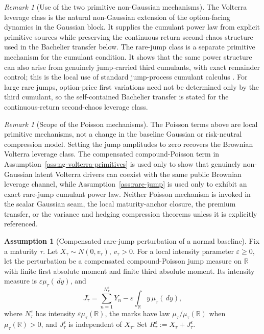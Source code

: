 \documentclass[11pt,a4paper]{amsart}
\theoremstyle{plain}
\theoremstyle{definition}
\newtheorem{assumption}[theorem]{Assumption}
\theoremstyle{remark}
\newtheorem{remark}[theorem]{Remark}
\newcommand{\R}{\mathbb{R}}
\newcommand{\dd}{\,d}
\begin{document}
\begin{remark}[Use of the two primitive non-Gaussian mechanisms]\label{rem:primitive-ng-lowerers}
The Volterra leverage class is the natural non-Gaussian extension of the option-facing dynamics in
the Gaussian block.  It supplies the cumulant power law from explicit primitive sources while
preserving the continuous-return second-chaos structure used in the Bachelier transfer below.  The
rare-jump class is a separate primitive mechanism for the cumulant condition.  It shows that the same
power structure can also arise from genuinely jump-carried third cumulants, with exact remainder
control; this is the local use of standard jump-process cumulant calculus
\cite{sato1999levy,contTankov2004jumps}.  For large rare jumps, option-price first variations need not be determined only by the
third cumulant, so the self-contained Bachelier transfer is stated for the continuous-return
second-chaos leverage class.
\end{remark}

\begin{remark}[Scope of the Poisson mechanisms]\label{rem:poisson-lowerer-scope}
The Poisson terms above are local primitive mechanisms, not a change in the baseline Gaussian or
risk-neutral compression model.  Setting the jump amplitudes to zero recovers the Brownian
Volterra leverage class.  The compensated compound-Poisson term in
Assumption~\ref{ass:ng-volterra-primitives} is used only to show that genuinely non-Gaussian
latent Volterra drivers can coexist with the same public Brownian leverage channel, while
Assumption~\ref{ass:rare-jump} is used only to exhibit an exact rare-jump cumulant power law.
Neither Poisson mechanism is invoked in the scalar Gaussian seam, the local maturity-anchor closure,
the premium transfer, or the variance and hedging compression theorems unless it is explicitly
referenced.
\end{remark}

\begin{assumption}[Compensated rare-jump perturbation of a normal baseline]\label{ass:jump-price}
Fix a maturity \(\tau\).  Let \(X_\tau\sim N(0,v_\tau)\), \(v_\tau>0\).  For a local intensity
parameter \(\varepsilon\ge0\), let the perturbation be a compensated compound-Poisson jump measure
on \(\R\) with finite first absolute moment and finite third absolute moment.  Its intensity
measure is \(\varepsilon\mu_\tau(\dd y)\), and
\[
        J_\tau^\varepsilon
        =
        \sum_{n=1}^{N_\tau^\varepsilon}Y_n
        -
        \varepsilon\int_\R y\,\mu_\tau(\dd y),
\]
where \(N_\tau^\varepsilon\) has intensity \(\varepsilon\mu_\tau(\R)\), the marks have law
\(\mu_\tau/\mu_\tau(\R)\) when \(\mu_\tau(\R)>0\), and \(J_\tau^\varepsilon\) is independent of
\(X_\tau\).  Set \(R_\tau^\varepsilon:=X_\tau+J_\tau^\varepsilon\).
\end{assumption}
\end{document}
